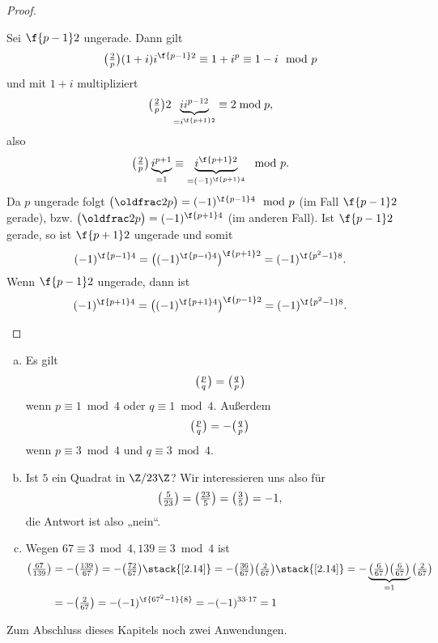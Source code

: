 \begin{st}
\begin{proof}
\begin{enumerate}[a)]
				Sei $\f {p-1}2$ ungerade.
				Dann gilt
				\[
					\legsym 2p (1 +i)i^{\f {p-1}2}
					\equiv 1 + i^p
					\equiv 1 -i \mod p
				\]
				und mit $1 + i$ multipliziert
				\[
					\legsym 2p 2 \underbrace{i i^{{p-1}2}}_{=i^{\f{p+1}2}}
					\equiv 2 \bmod p,
				\]
				also
				\[
					\legsym 2p \underbrace{i^{p+1}}_{= 1} \equiv \underbrace{i^{\f{p+1}2}}_{=(-1)^{\f {p+1}4}} \mod p.
				\]
				Da $p$ ungerade folgt
				$\legsym 2p = (-1)^{\f {p-1}4} \mod p$ (im Fall $\f {p-1}2$ gerade), bzw. $\legsym 2p = (-1)^{\f{p+1}4}$ (im anderen Fall).
				Ist $\f {p-1}2$ gerade, so ist $\f {p+1}2$ ungerade und somit
				\[
					(-1)^{\f{p-1}4}
					= \big((-1)^{\f{p-i}4} \big)^{\f{p+1}2}
					= (-1)^{\f{p^2-1}8}.
				\]
				Wenn $\f {p-1}2$ ungerade, dann ist
				\[
					(-1)^{\f {p+1}4}
					= \big( (-1)^{\f {p+1}4} \big)^{\f{p-1}2}
					= (-1)^{\f {p^2 - 1}8}.
				\]
		\end{enumerate}
	\end{proof}
\end{st}


\begin{nt} \label{2.16}
	\begin{enumerate}[a)]
		\item
			Es gilt
			\[
				\legsym pq = \legsym qp
			\]
			wenn $p \equiv 1 \bmod 4$ oder $q \equiv 1 \bmod 4$.
			Außerdem
			\[
				\legsym pq = - \legsym qp
			\]
			wenn $p \equiv 3 \bmod 4$ und $q \equiv 3 \bmod 4$.
		\item
			Ist $5$ ein Quadrat in $\Z / 23\Z$?
			Wir interessieren uns also für
			\[
				\legsym 5{23}
				= \legsym {23}5
				= \legsym 35
				= -1,
			\]
			die Antwort ist also „nein“.
		\item
			Wegen $67 \equiv 3 \bmod 4, 139 \equiv 3 \bmod 4$ ist
			\begin{align*}
				\legsym{67}{139}
				&= - \legsym{139}{67}
				= - \legsym{72}{67}
				\stack{\ref{2.14}}= - \legsym{36}{67} \legsym{2}{67}
				\stack{\ref{2.14}}= - \underbrace{\legsym{6}{67} \legsym{6}{67}}_{=1} \legsym{2}{67} \\
				&= - \legsym{2}{67}
				= - (-1)^{\f{67^2-1}{8}}
				= - (-1)^{33\cdot 17}
				= 1
			\end{align*}
	\end{enumerate}
\end{nt}

Zum Abschluss dieses Kapitels noch zwei Anwendungen.

